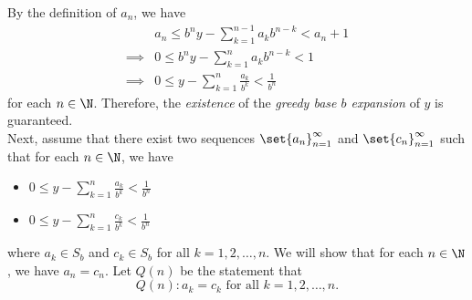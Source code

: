     By the definition of $a_{n}$, we have
    \begin{align*}
        &a_{n} \leq b^{n}y - \sum_{k = 1}^{n - 1} a_{k}b^{n - k} < a_{n} + 1 \\
        \implies &0 \leq b^{n}y - \sum_{k = 1}^{n} a_{k}b^{n - k} < 1 \\
        \implies &0 \leq y - \sum_{k = 1}^{n} \frac{a_{k}}{b^{k}} < \frac{1}{b^{n}}
    \end{align*}
    for each $n \in \N$. Therefore, the \emph{existence} of the \emph{greedy base $b$ expansion} of $y$ is guaranteed.
    \\[6mm]
    Next, assume that there exist two sequences $\set{a_{n}}_{n = 1}^{\infty}$
    and $\set{c_{n}}_{n = 1}^{\infty}$ such that for each $n \in \N$, we have

    \begin{itemize}
        \item $\displaystyle 0 \leq y - \sum_{k = 1}^{n} \frac{a_{k}}{b^{k}} < \frac{1}{b^{n}}$
        \item $\displaystyle 0 \leq y - \sum_{k = 1}^{n} \frac{c_{k}}{b^{k}} < \frac{1}{b^{n}}$
    \end{itemize}
    where $a_{k} \in S_{b}$ and $c_{k} \in S_{b}$ for all $k = 1, 2, \dots, n$. We will show that
    for each $n \in \N$, we have $a_{n} = c_{n}$. Let $Q(n)$ be the statement that
    \[
    Q(n) : a_{k} = c_{k} \text{ for all } k = 1, 2, \dots, n.
    \]
